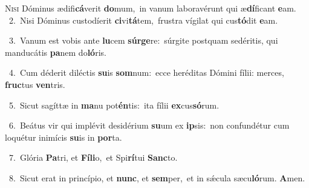 \lettrine{\initial\textcolor{\initialcolor}{N}}{isi} Dóminus ædifi\-\textbf{cá}\-verit \textbf{do}\-mum,~\star in vanum laboravérunt qui æ\-\textbf{dí}\-ficant \textbf{e}\-am.\\
{\numbfont\textcolor{\numbcolor}{~2.}}~Nisi Dóminus custodíerit \textbf{ci}\-vi\-\textbf{tá}\-tem,~\star frustra vígilat qui cus\-\textbf{tó}\-dit \textbf{e}\-am.\par
{\numbfont\textcolor{\numbcolor}{~3.}}~Vanum est vobis ante \textbf{lu}\-cem \textbf{súr}\-\textbf{ge}re:~\star súrgite postquam sedéritis, qui manducátis \textbf{pa}\-nem do\-\textbf{ló}\-ris.\par
{\numbfont\textcolor{\numbcolor}{~4.}}~Cum déderit diléctis \textbf{su}\-is \textbf{som}\-num:~\star ecce heréditas Dómini fílii: merces, \textbf{fruc}\-tus \textbf{ven}\-tris.\par
{\numbfont\textcolor{\numbcolor}{~5.}}~Sicut sagíttæ in \textbf{ma}\-nu pot\-\textbf{én}\-tis:~\star ita fílii \textbf{ex}\-cus\-\textbf{só}\-rum.\par
{\numbfont\textcolor{\numbcolor}{~6.}}~Beátus vir qui implévit desidérium \textbf{su}\-um ex \textbf{ip}\-sis:~\star non confundétur cum loquétur inimícis \textbf{su}\-is in \textbf{por}\-ta.\par
{\numbfont\textcolor{\numbcolor}{~7.}}~Glória \textbf{Pa}\-tri, et \textbf{Fí}\-\textbf{li}o,~\star et Spi\-\textbf{rí}\-tui \textbf{Sanc}\-to.\par
{\numbfont\textcolor{\numbcolor}{~8.}}~Sicut erat in princípio, et \textbf{nunc}\-, et \textbf{sem}\-per,~\star et in sǽcula sæcu\-\textbf{ló}\-rum. \textbf{A}\-men.\par
